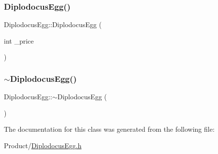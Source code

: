 \mbox{\label{classDiplodocusEgg_a8ce0b60b35099e28c9a6e9cfce1e02ff}} 
\subsubsection{\texorpdfstring{DiplodocusEgg()}{DiplodocusEgg()}\hspace{0.1cm}{\footnotesize\ttfamily [2/2]}}
{\footnotesize\ttfamily Diplodocus\+Egg\+::\+Diplodocus\+Egg (\begin{DoxyParamCaption}\item[{int}]{\+\_\+price }\end{DoxyParamCaption})}

\mbox{\label{classDiplodocusEgg_a02b056492f5688bca873b734c0e9fc15}} 
\subsubsection{\texorpdfstring{$\sim$DiplodocusEgg()}{~DiplodocusEgg()}}
{\footnotesize\ttfamily Diplodocus\+Egg\+::$\sim$\+Diplodocus\+Egg (\begin{DoxyParamCaption}{ }\end{DoxyParamCaption})}



The documentation for this class was generated from the following file\+:\begin{DoxyCompactItemize}
\item 
Product/\mbox{\hyperlink{DiplodocusEgg_8h}{Diplodocus\+Egg.\+h}}\end{DoxyCompactItemize}
